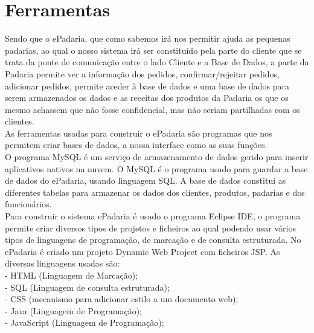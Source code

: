 \section{Ferramentas}
Sendo que o ePadaria, que como sabemos irá nos permitir ajuda as pequenas padarias, ao qual o nosso sistema irá ser constituído pela parte do cliente que se trata da ponte de comunicação entre o lado Cliente e a Base de Dados, a parte da Padaria permite ver a informação dos pedidos, confirmar/rejeitar pedidos, adicionar pedidos, permite aceder à base de dados e uma base de dados para serem armazenados os dados e as receitas dos produtos da Padaria os que os mesmo achassem que não fosse confidencial, mas não seriam partilhadas com os clientes.\\
As ferramentas usadas para construir o ePadaria são programas que nos permitem criar bases de dados, a nossa interface como as suas funções. \\
O programa MySQL é um serviço de armazenamento de dados gerido para inserir aplicativos nativos na nuvem. O MySQL é o programa usado para guardar a base de dados do ePadaria, usando linguagem SQL. A base de dados constitui as diferentes tabelas para armazenar os dados dos clientes, produtos, padarias e dos funcionários.\\
Para construir o sistema ePadaria é usado o programa Eclipse IDE, o programa permite criar diversos tipos de projetos e ficheiros ao qual podendo usar vários tipos de linguagens de programação, de marcação e de consulta estruturada. No ePadaria é criado um projeto Dynamic Web Project com ficheiros JSP. As diversas linguagens usadas são:\\
- HTML (Linguagem de Marcação);\\
- SQL (Linguagem de consulta estruturada);\\
- CSS (mecanismo para adicionar estilo a um documento web);\\
- Java (Linguagem de Programação);\\
- JavaScript (Linguagem de Programação);\\